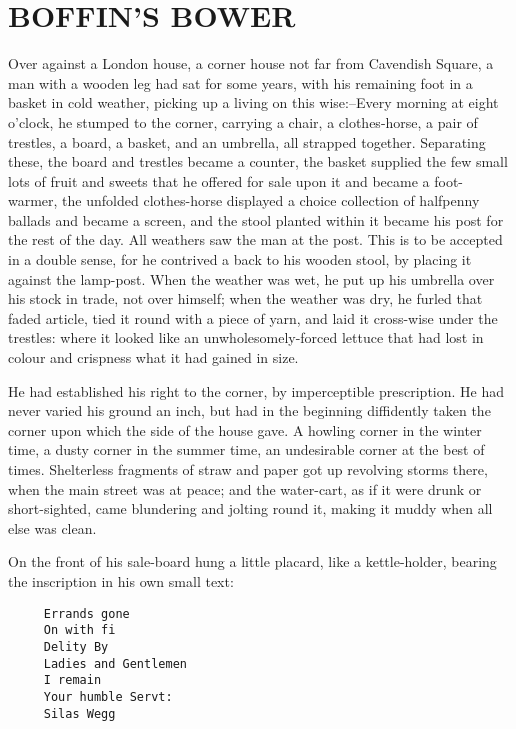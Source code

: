 
\chapter{BOFFIN’S BOWER}

Over against a London house, a corner house not far from Cavendish
Square, a man with a wooden leg had sat for some years, with his
remaining foot in a basket in cold weather, picking up a living on
this wise:--Every morning at eight o’clock, he stumped to the corner,
carrying a chair, a clothes-horse, a pair of trestles, a board, a
basket, and an umbrella, all strapped together. Separating these, the
board and trestles became a counter, the basket supplied the few small
lots of fruit and sweets that he offered for sale upon it and became a
foot-warmer, the unfolded clothes-horse displayed a choice collection of
halfpenny ballads and became a screen, and the stool planted within it
became his post for the rest of the day. All weathers saw the man at the
post. This is to be accepted in a double sense, for he contrived a
back to his wooden stool, by placing it against the lamp-post. When the
weather was wet, he put up his umbrella over his stock in trade, not
over himself; when the weather was dry, he furled that faded article,
tied it round with a piece of yarn, and laid it cross-wise under the
trestles: where it looked like an unwholesomely-forced lettuce that had
lost in colour and crispness what it had gained in size.

He had established his right to the corner, by imperceptible
prescription. He had never varied his ground an inch, but had in the
beginning diffidently taken the corner upon which the side of the house
gave. A howling corner in the winter time, a dusty corner in the summer
time, an undesirable corner at the best of times. Shelterless fragments
of straw and paper got up revolving storms there, when the main street
was at peace; and the water-cart, as if it were drunk or short-sighted,
came blundering and jolting round it, making it muddy when all else was
clean.

On the front of his sale-board hung a little placard, like a
kettle-holder, bearing the inscription in his own small text:

\begin{verbatim}
     Errands gone
     On with fi
     Delity By
     Ladies and Gentlemen
     I remain
     Your humble Servt:
     Silas Wegg
\end{verbatim}

